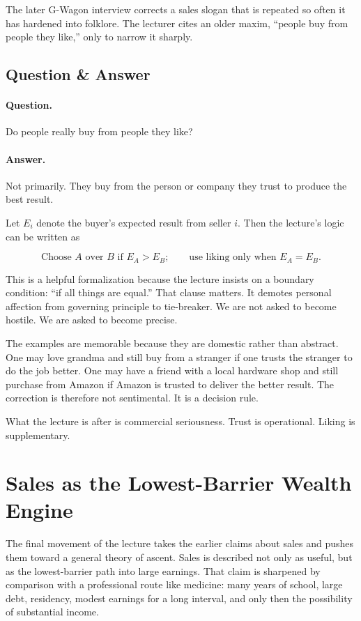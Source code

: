 The later G-Wagon interview corrects a sales slogan that is repeated so often it has hardened into folklore. The lecturer cites an older maxim, ``people buy from people they like,'' only to narrow it sharply.

\subsection{Question \& Answer}

\paragraph{Question.} Do people really buy from people they like?

\paragraph{Answer.} Not primarily. They buy from the person or company they trust to produce the best result.

Let \(E_i\) denote the buyer's expected result from seller \(i\). Then the lecture's logic can be written as

\begin{equation}
\text{Choose } A \text{ over } B \text{ if } E_A > E_B;
\qquad
\text{use liking only when } E_A = E_B.
\end{equation}

This is a helpful formalization because the lecture insists on a boundary condition: ``if all things are equal.'' That clause matters. It demotes personal affection from governing principle to tie-breaker. We are not asked to become hostile. We are asked to become precise.

The examples are memorable because they are domestic rather than abstract. One may love grandma and still buy from a stranger if one trusts the stranger to do the job better. One may have a friend with a local hardware shop and still purchase from Amazon if Amazon is trusted to deliver the better result. The correction is therefore not sentimental. It is a decision rule.

What the lecture is after is commercial seriousness. Trust is operational. Liking is supplementary.

\section{Sales as the Lowest-Barrier Wealth Engine}

The final movement of the lecture takes the earlier claims about sales and pushes them toward a general theory of ascent. Sales is described not only as useful, but as the lowest-barrier path into large earnings. That claim is sharpened by comparison with a professional route like medicine: many years of school, large debt, residency, modest earnings for a long interval, and only then the possibility of substantial income.

